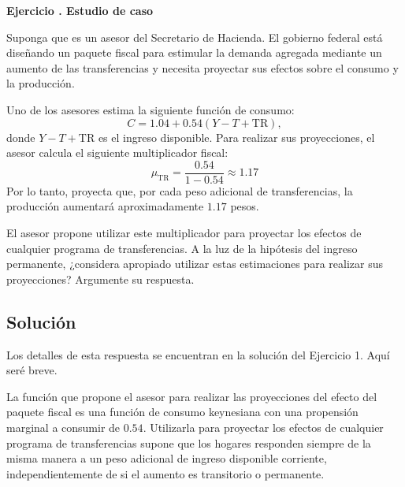 \documentclass[11pt]{article}
\let\enumerateoriginal\enumerate
\let\endenumerateoriginal\endenumerate
\renewenvironment{enumerate}{%
  \enumerateoriginal
  \setlength{\itemsep}{0.5em}%
  \setlength{\parsep}{0pt}%
  \setlength{\topsep}{0.4em}%
}{\endenumerateoriginal}
\newcounter{problema}
\newenvironment{problema}[1]{%
  \par
  \refstepcounter{problema}%
  \addvspace{0.9em}%
  \noindent\textbf{Ejercicio \theproblema. #1}
  \par\nobreak\smallskip
}{\par}
\begin{document}
\begin{problema}{Estudio de caso}

Suponga que es un asesor del Secretario de Hacienda. El gobierno federal está diseñando un paquete fiscal para estimular la demanda agregada mediante un aumento de las transferencias y necesita proyectar sus efectos sobre el consumo y la producción.

Uno de los asesores estima la siguiente función de consumo:
\[
    C=1.04+0.54(Y-T+\mathrm{TR}),
\]
donde $Y-T+\mathrm{TR}$ es el ingreso disponible. Para realizar sus proyecciones, el asesor calcula el siguiente multiplicador fiscal:
    \[
        \mu_{\mathrm{TR}}
        =
        \frac{0.54}{1-0.54} \approx 1.17
    \]
Por lo tanto, proyecta que, por cada peso adicional de transferencias, la producción aumentará aproximadamente $1.17$ pesos.
\begin{enumerate}
    \item El asesor propone utilizar este multiplicador para proyectar los efectos de cualquier programa de transferencias. A la luz de la hipótesis del ingreso permanente, ¿considera apropiado utilizar estas estimaciones para realizar sus proyecciones? Argumente su respuesta.
\end{enumerate}

\end{problema}


\subsection*{Solución}

Los detalles de esta respuesta se encuentran en la solución del Ejercicio 1. Aquí seré breve.

La función que propone el asesor para realizar las proyecciones del efecto del paquete fiscal es una función de consumo keynesiana con una propensión marginal a consumir de \(0.54\). Utilizarla para proyectar los efectos de cualquier programa de transferencias supone que los hogares responden siempre de la misma manera a un peso adicional de ingreso disponible corriente, independientemente de si el aumento es transitorio o permanente.
\end{document}

